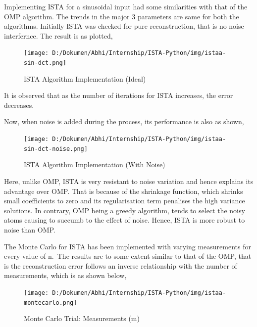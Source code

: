 \documentclass[
  letterpaper,
  DIV=11,
  numbers=noendperiod]{scrartcl}
\begin{document}
Implementing ISTA for a sinusoidal input had some similarities with that
of the OMP algorithm. The trends in the major 3 parameters are same for
both the algorithms. Initially ISTA was checked for pure reconstruction,
that is no noise interfernce. The result is as plotted,

\begin{figure}[H]

{\centering \texttt{[image: D:/Dokumen/Abhi/Internship/ISTA-Python/img/istaa-sin-dct.png]}

}

\caption{ISTA Algorithm Implementation (Ideal)}

\end{figure}%

It is observed that as the number of iterations for ISTA increases, the
error decreases.

Now, when noise is added during the process, its performance is also as
shown,

\begin{figure}[H]

{\centering \texttt{[image: D:/Dokumen/Abhi/Internship/ISTA-Python/img/istaa-sin-dct-noise.png]}

}

\caption{ISTA Algorithm Implementation (With Noise)}

\end{figure}%

Here, unlike OMP, ISTA is very resistant to noise variation and hence
explains its advantage over OMP. That is because of the shrinkage
function, which shrinks small coefficients to zero and its
regularisation term penalises the high variance solutions. In contrary,
OMP being a greedy algorithm, tends to select the noisy atoms causing to
succumb to the effect of noise. Hence, ISTA is more robust to noise than
OMP.

The Monte Carlo for ISTA has been implemented with varying measurements
for every value of n.~The results are to some extent similar to that of
the OMP, that is the reconstruction error follows an inverse
relationship with the number of measurements, which is as shown below,

\begin{figure}[H]

{\centering \texttt{[image: D:/Dokumen/Abhi/Internship/ISTA-Python/img/istaa-montecarlo.png]}

}

\caption{Monte Carlo Trial: Measurements (m)}

\end{figure}%
\end{document}
